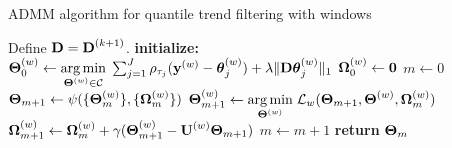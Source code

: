 \documentclass[12pt]{article}
\newcommand{\V}[1]{{\bm{\mathbf{\MakeLowercase{#1}}}}} %
\newcommand{\Vn}[2]{\V{#1}^{(#2)}} %
\newcommand{\M}[1]{{\bm{\mathbf{\MakeUppercase{#1}}}}} %
\newcommand{\Mn}[2]{\M{#1}^{(#2)}} %
\begin{document}
	\begin{algorithm}
		\caption{ADMM algorithm for quantile trend filtering with windows}\label{alg:admm}
		\begin{algorithmic}
			\State Define $\M{D} = \Mn{D}{k+1}$.
			\State \textbf{initialize:}
			\State $\Mn{\Theta}{w}_0 \gets \underset{\Mn{\Theta}{w} \in \mathcal{C}}{\arg \min}\;
			 \sum_{j=1}^J\rho_{\tau_j}(\Vn{y}{w} - \Vn{\theta}{w}_{j})+\lambda \lVert \M{D}\Vn{\theta}{w}_{j}\rVert_1$
			\State $\Mn{\Omega}{w}_0 \gets \M{0}$
			\EndFor
			\State $m \gets 0$
			\Repeat{}
			\State $\M{\Theta}_{m+1} \gets \psi(\{\Mn{\Theta}{w}_m\}, \{\Mn{\Omega}{w}_m\})$
			\State $\Mn{\Theta}{w}_{m+1} \gets \underset{\Mn{\Theta}{w}}{\arg\min}\; \mathcal{L}_w(\M{\Theta}_{m+1}, \Mn{\Theta}{w}, \Mn{\Omega}{w}_{m})$
			\State
			$\Mn{\Omega}{w}_{m+1} \gets \Mn{\Omega}{w}_m + \gamma(\Mn{\Theta}{w}_{m+1} - \Mn{U}{w}\M{\Theta}_{m+1})$
			\EndFor
			\State $m \gets m + 1$
			\State \textbf{return} $\M{\Theta}_m$
		\end{algorithmic}
	\end{algorithm}
\end{document}

